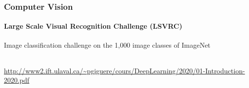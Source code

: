\documentclass[english,usenames,dvipsnames]{beamer}
\begin{document}
\begin{frame}
	\frametitle{Computer Vision}
	\framesubtitle{Large Scale Visual Recognition Challenge (LSVRC)}
	{\footnotesize Image classification challenge on the 1,000 image classes of ImageNet}\\[3mm]
	\\[-3mm]
	{\tiny \url{http://www2.ift.ulaval.ca/~pgiguere/cours/DeepLearning/2020/01-Introduction-2020.pdf}}
\end{frame}
\end{document}
